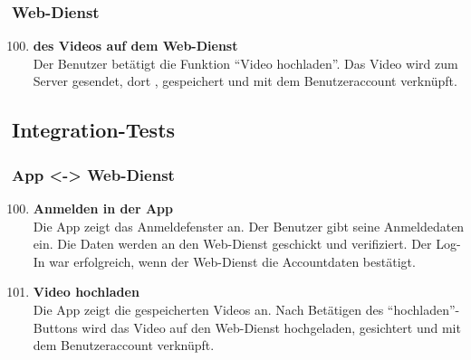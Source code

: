 \subsubsection{\gls{Web-Dienst}}
\begin{enumerate}[\bfseries{T}10]  
\setcounter{enumi}{99}{}
\item \textbf{ des Videos auf dem \gls{Web-Dienst}} \hfill\\  
Der Benutzer bet\"atigt die Funktion ``Video hochladen''. Das Video wird zum Server gesendet, dort , gespeichert und mit dem Benutzeraccount verkn\"upft.
\end{enumerate}


\subsection{Integration-Tests}
\subsubsection{\gls{App} <-> \gls{Web-Dienst}}
\begin{enumerate}[\bfseries{T}10]  
\setcounter{enumi}{99}{}

\item \textbf{Anmelden in der \gls{App}} \hfill\\
Die \gls{App} zeigt das Anmeldefenster an. Der Benutzer gibt seine Anmeldedaten ein. Die Daten werden an den \gls{Web-Dienst} geschickt und verifiziert. Der Log-In war erfolgreich, wenn der \gls{Web-Dienst} die Accountdaten best\"atigt.

\item \textbf{Video hochladen} \hfill\\
Die \gls{App} zeigt die gespeicherten Videos an. Nach Bet\"atigen des ``hochladen''-Buttons wird das Video auf den \gls{Web-Dienst} hochgeladen, gesichtert und mit dem Benutzeraccount verkn\"upft.
\end{enumerate}

